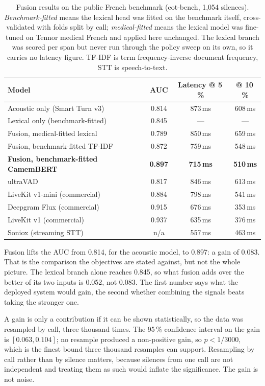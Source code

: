 \begin{table}[H]
\centering
\caption[Fusion results on the French benchmark]{Fusion results on the public French
benchmark (eot-bench, 1{,}054 silences). \emph{Benchmark-fitted} means the lexical head was
fitted on the benchmark itself, cross-validated with folds split by call;
\emph{medical-fitted} means the lexical model was fine-tuned on Tennor medical French and
applied here unchanged. The lexical branch was scored per span but never run through the policy sweep on its own,
so it carries no latency figure. TF-IDF is term frequency-inverse document frequency, STT is
speech-to-text.}
\label{tab:fusion}
\begin{tabular}{@{}lccc@{}}
\toprule
Model & AUC & Latency @ 5\,\% & @ 10\,\% \\
\midrule
Acoustic only (Smart Turn v3) & 0.814 & 873\,ms & 608\,ms \\
Lexical only (benchmark-fitted) & 0.845 & --- & --- \\
\midrule
Fusion, medical-fitted lexical & 0.789 & 850\,ms & 659\,ms \\
Fusion, benchmark-fitted TF-IDF & 0.872 & 759\,ms & 548\,ms \\
\textbf{Fusion, benchmark-fitted CamemBERT} & \textbf{0.897} & \textbf{715\,ms} & \textbf{510\,ms} \\
\midrule
ultraVAD & 0.817 & 846\,ms & 613\,ms \\
LiveKit v1-mini (commercial) & 0.884 & 798\,ms & 541\,ms \\
Deepgram Flux (commercial) & 0.915 & 676\,ms & 353\,ms \\
LiveKit v1 (commercial) & 0.937 & 635\,ms & 376\,ms \\
Soniox (streaming STT) & n/a & 557\,ms & 463\,ms \\
\bottomrule
\end{tabular}
\end{table}

Fusion lifts the AUC from 0.814, for the acoustic model, to 0.897: a gain of 0.083. That is the comparison the objectives are stated against,
but not the whole picture. The lexical branch alone reaches 0.845, so what fusion adds over
the better of its two inputs is 0.052, not 0.083. The first number says what the deployed system
would gain, the second whether combining the signals beats taking the stronger one.

A gain is only a contribution if it can be shown statistically, so the data was resampled
by call, three thousand times. The 95\,\% confidence interval on
the gain is $[0.063, 0.104]$; no resample produced a non-positive gain, so $p < 1/3000$, which is the finest bound three
thousand resamples can support. Resampling by
call rather than by silence matters, because silences from one call are not
independent and treating them as such would inflate the significance. The gain is not noise.

